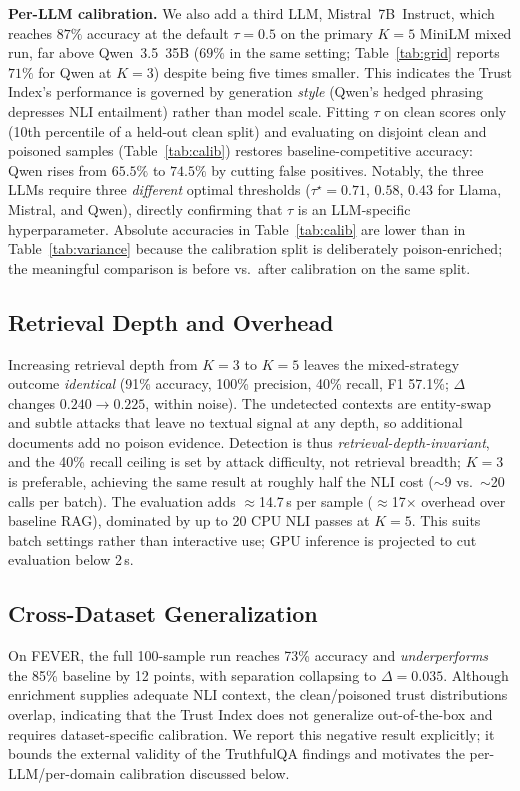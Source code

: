 \textbf{Per-LLM calibration.} We also add a third LLM, Mistral~7B~Instruct, which reaches $87\%$ accuracy at the default $\tau{=}0.5$ on the primary $K{=}5$ MiniLM mixed run, far above Qwen~3.5~35B ($69\%$ in the same setting; Table~\ref{tab:grid} reports $71\%$ for Qwen at $K{=}3$) despite being five times smaller. This indicates the Trust Index's performance is governed by generation \emph{style} (Qwen's hedged phrasing depresses NLI entailment) rather than model scale. Fitting $\tau$ on clean scores only (10th percentile of a held-out clean split) and evaluating on disjoint clean and poisoned samples (Table~\ref{tab:calib}) restores baseline-competitive accuracy: Qwen rises from $65.5\%$ to $74.5\%$ by cutting false positives. Notably, the three LLMs require three \emph{different} optimal thresholds ($\tau^\star{=}0.71$, $0.58$, $0.43$ for Llama, Mistral, and Qwen), directly confirming that $\tau$ is an LLM-specific hyperparameter. Absolute accuracies in Table~\ref{tab:calib} are lower than in Table~\ref{tab:variance} because the calibration split is deliberately poison-enriched; the meaningful comparison is before vs.\ after calibration on the same split.

\subsection{Retrieval Depth and Overhead}
Increasing retrieval depth from $K{=}3$ to $K{=}5$ leaves the mixed-strategy outcome \emph{identical} (91\% accuracy, 100\% precision, 40\% recall, F1 57.1\%; $\Delta$ changes $0.240\!\to\!0.225$, within noise). The undetected contexts are entity-swap and subtle attacks that leave no textual signal at any depth, so additional documents add no poison evidence. Detection is thus \emph{retrieval-depth-invariant}, and the 40\% recall ceiling is set by attack difficulty, not retrieval breadth; $K{=}3$ is preferable, achieving the same result at roughly half the NLI cost ($\sim$9 vs.\ $\sim$20 calls per batch).
The evaluation adds $\approx$14.7\,s per sample ($\approx$17$\times$ overhead over baseline RAG), dominated by up to 20 CPU NLI passes at $K{=}5$. This suits batch settings rather than interactive use; GPU inference is projected to cut evaluation below 2\,s.

\subsection{Cross-Dataset Generalization}
On FEVER, the full 100-sample run reaches 73\% accuracy and \emph{underperforms} the 85\% baseline by 12 points, with separation collapsing to $\Delta{=}0.035$. Although enrichment supplies adequate NLI context, the clean/poisoned trust distributions overlap, indicating that the Trust Index does not generalize out-of-the-box and requires dataset-specific calibration. We report this negative result explicitly; it bounds the external validity of the TruthfulQA findings and motivates the per-LLM/per-domain calibration discussed below.

